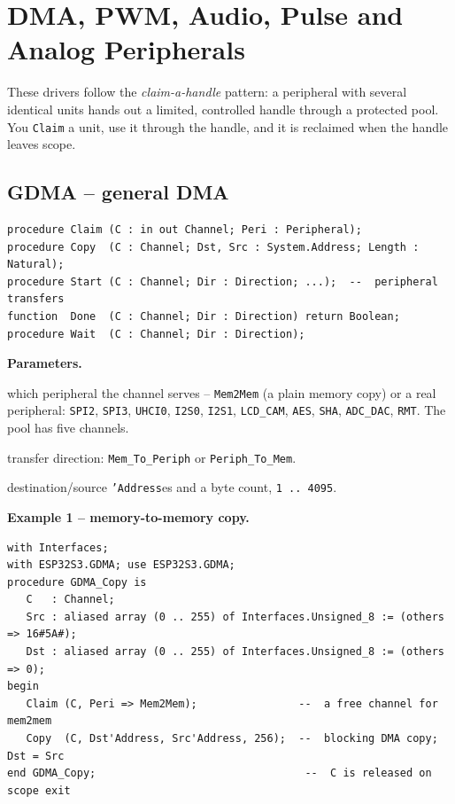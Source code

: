 \chapter{DMA, PWM, Audio, Pulse and Analog Peripherals}
\label{ch:hal2}

These drivers follow the \emph{claim-a-handle} pattern: a peripheral with several
identical units hands out a limited, controlled handle through a protected pool.
You \texttt{Claim} a unit, use it through the handle, and it is reclaimed when the
handle leaves scope.

\section{GDMA -- general DMA}

\begin{lstlisting}
procedure Claim (C : in out Channel; Peri : Peripheral);
procedure Copy  (C : Channel; Dst, Src : System.Address; Length : Natural);
procedure Start (C : Channel; Dir : Direction; ...);  --  peripheral transfers
function  Done  (C : Channel; Dir : Direction) return Boolean;
procedure Wait  (C : Channel; Dir : Direction);
\end{lstlisting}

\textbf{Parameters.}
\begin{description}[style=nextline]
\item[\texttt{Peri}] which peripheral the channel serves -- \texttt{Mem2Mem} (a
  plain memory copy) or a real peripheral: \texttt{SPI2}, \texttt{SPI3},
  \texttt{UHCI0}, \texttt{I2S0}, \texttt{I2S1}, \texttt{LCD\_CAM}, \texttt{AES},
  \texttt{SHA}, \texttt{ADC\_DAC}, \texttt{RMT}. The pool has five channels.
\item[\texttt{Dir}] transfer direction: \texttt{Mem\_To\_Periph} or
  \texttt{Periph\_To\_Mem}.
\item[\texttt{Dst}, \texttt{Src}, \texttt{Length}] destination/source
  \texttt{'Address}es and a byte count, \texttt{1\,..\,4095}.
\end{description}

\textbf{Example 1 -- memory-to-memory copy.}
\begin{lstlisting}
with Interfaces;
with ESP32S3.GDMA; use ESP32S3.GDMA;
procedure GDMA_Copy is
   C   : Channel;
   Src : aliased array (0 .. 255) of Interfaces.Unsigned_8 := (others => 16#5A#);
   Dst : aliased array (0 .. 255) of Interfaces.Unsigned_8 := (others => 0);
begin
   Claim (C, Peri => Mem2Mem);                --  a free channel for mem2mem
   Copy  (C, Dst'Address, Src'Address, 256);  --  blocking DMA copy; Dst = Src
end GDMA_Copy;                                 --  C is released on scope exit
\end{lstlisting}

